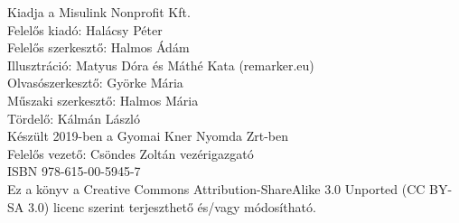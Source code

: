    
\cleardoublepage\null\vfill
\pagestyle{empty}
\begin{minipage}[b]{0.9\textwidth}
\footnotesize\raggedright
\setlength{\parskip}{0.5\baselineskip}
Kiadja a Misulink Nonprofit Kft.\\
Felelős kiadó: Halácsy Péter \\
Felelős szerkesztő: Halmos Ádám \\
Illusztráció: Matyus Dóra és Máthé Kata (remarker.eu) \\
Olvasószerkesztő: Györke Mária \\
Műszaki szerkesztő: Halmos Mária \\
Tördelő: Kálmán László\\
Készült 2019-ben a Gyomai Kner Nyomda Zrt-ben \\
Felelős vezető: Csöndes Zoltán  vezérigazgató \\
ISBN 978-615-00-5945-7\\
\smallskip
Ez a könyv a Creative Commons Attribution-ShareAlike 3.0 Unported (CC BY-SA 3.0) licenc szerint terjeszthető és/vagy módosítható.
\end{minipage}
\vspace*{2\baselineskip}


